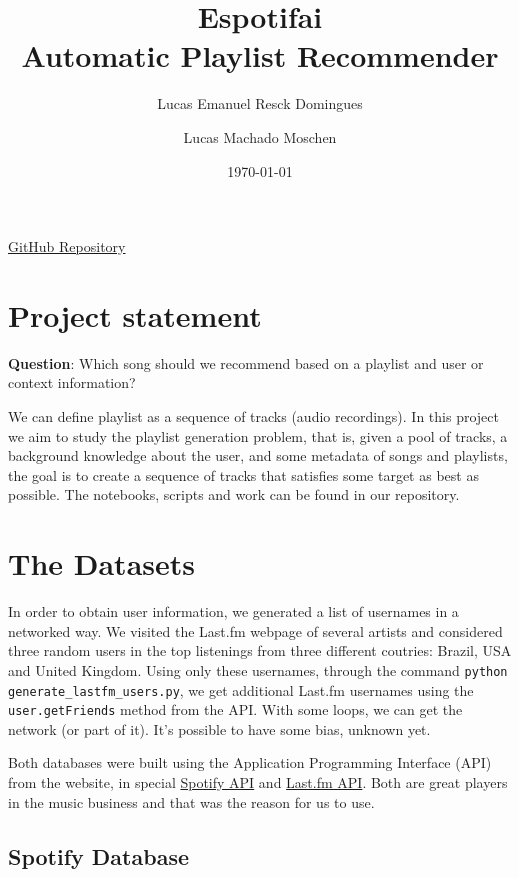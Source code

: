 \documentclass{article}
\title{Espotifai\\
\vspace{10pt}
\large Automatic Playlist Recommender}
\author[]{Lucas Emanuel Resck Domingues}
\author[]{Lucas Machado Moschen}
\affil[]{\textit{School of Applied Mathematics}
\\ \textit{Getulio Vargas Foundation}}
\date{\today}
\begin{document}
\maketitle

\begin{center}
    \href{https://github.com/lucasresck/espotifai}{GitHub Repository}
\end{center}

\section{Project statement}

    \textbf{Question}: Which song should we recommend based on
    a playlist and user or context information?

    We can define playlist as a sequence of tracks (audio recordings).
    In this project we aim to study the playlist generation problem, that is,
    given a pool of tracks, a background knowledge about the user,
    and some metadata of songs and playlists, the goal is to create a sequence
    of tracks that satisfies some target as best as possible. The notebooks,
    scripts and work can be found in our repository.

\section{The Datasets}

In order to obtain user information, we generated a list of usernames in a
networked way.  We visited the Last.fm webpage of several artists and
considered three random users in the top listenings from three different
coutries: Brazil, USA and United Kingdom. Using only these usernames, through
the command \lstinline{python generate_lastfm_users.py},  we get additional
Last.fm usernames using the \lstinline{user.getFriends} method from the API. 
With some loops, we can get the network (or part of it). It's possible to have
some bias, unknown yet.

Both databases were built using the Application Programming Interface (API) from the
website, in special
\href{https://developer.spotify.com/documentation/web-api/}{Spotify API} and
\href{https://www.last.fm/api/}{Last.fm API}. Both are great players in the
music business and that was the reason for us to use. 

\subsection{Spotify Database}
\end{document}
